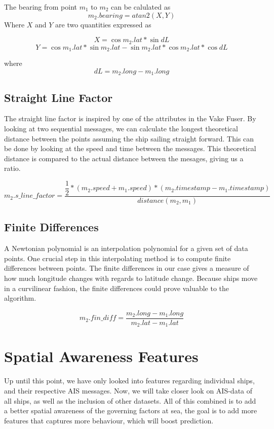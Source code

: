 The bearing from point $m_1$ to $m_2$ can be calulated as
$$
	m_2.bearing = atan2(X, Y)
$$
Where $X$ and $Y$ are two quantities expressed as

$$
	X= \cos m_2.lat*\sin dL
$$
$$
	Y=\cos m_1.lat*\sin m_2.lat-\sin m_2.lat*\cos m_2.lat*\cos dL
$$

where
$$
	dL = m_2.long - m_1.long
$$


\subsection{Straight Line Factor}
The straight line factor is inspired by one of the attributes in the Vake Fuser. By looking at two sequential messages, we can calculate the longest theoretical distance between the points assuming the ship sailing straight forward. This can be done by looking at the speed and time between the messages. This theoretical distance is compared to the actual distance between the mesages, giving us a ratio.

$$
	m_2.s\_line\_factor = \dfrac{\dfrac{1}{2}*(m_2.speed + m_1.speed)*(m_2.timestamp-m_1.timestamp)}{distance(m_2, m_1)}
$$


\subsection{Finite Differences}
A Newtonian polynomial is an interpolation polynomial for a given set of data points. One crucial step in this interpolating method is to compute finite differences between points. The finite differences in our case gives a measure of how much longitude changes with regards to latitude change. Because ships move in a curvilinear fashion, the finite differences could prove valuable to the algorithm.

$$
	m_2.fin\_diff = \dfrac{m_2.long- m_1.long}{m_2.lat-m_1.lat}
$$

\section{Spatial Awareness Features}
Up until this point, we have only looked into features regarding individual ships, and their respective AIS messages. Now, we will take closer look on AIS-data of all ships, as well as the inclusion of other datasets. All of this combined is to add a better spatial awareness of the governing factors at sea, the goal is to add more features that captures more behaviour, which will boost prediction. 

